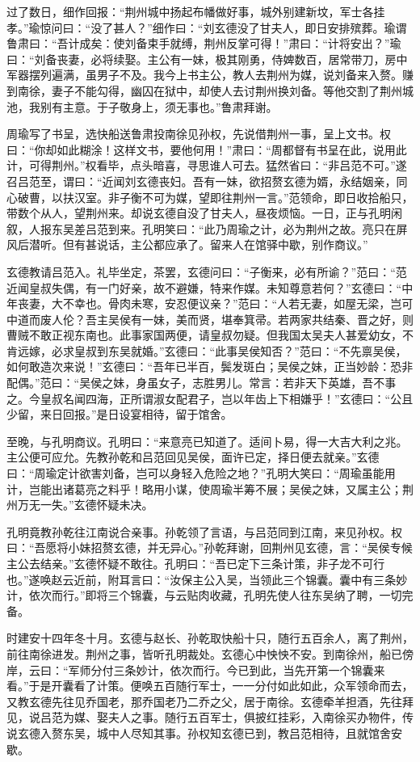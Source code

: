 过了数日，细作回报：“荆州城中扬起布幡做好事，城外别建新坟，军士各挂孝。”瑜惊问曰：“没了甚人？”细作曰：“刘玄德没了甘夫人，即日安排殡葬。瑜谓鲁肃曰：“吾计成矣：使刘备束手就缚，荆州反掌可得！”肃曰：“计将安出？”瑜曰：“刘备丧妻，必将续娶。主公有一妹，极其刚勇，侍婢数百，居常带刀，房中军器摆列遍满，虽男子不及。我今上书主公，教人去荆州为媒，说刘备来入赘。赚到南徐，妻子不能勾得，幽囚在狱中，却使人去讨荆州换刘备。等他交割了荆州城池，我别有主意。于子敬身上，须无事也。”鲁肃拜谢。

周瑜写了书呈，选快船送鲁肃投南徐见孙权，先说借荆州一事，呈上文书。权曰：“你却如此糊涂！这样文书，要他何用！”肃曰：“周都督有书呈在此，说用此计，可得荆州。”权看毕，点头暗喜，寻思谁人可去。猛然省曰：“非吕范不可。”遂召吕范至，谓曰：“近闻刘玄德丧妇。吾有一妹，欲招赘玄德为婿，永结姻亲，同心破曹，以扶汉室。非子衡不可为媒，望即往荆州一言。”范领命，即日收拾船只，带数个从人，望荆州来。却说玄德自没了甘夫人，昼夜烦恼。一日，正与孔明闲叙，人报东吴差吕范到来。孔明笑曰：“此乃周瑜之计，必为荆州之故。亮只在屏风后潜听。但有甚说话，主公都应承了。留来人在馆驿中歇，别作商议。”

玄德教请吕范入。礼毕坐定，茶罢，玄德问曰：“子衡来，必有所谕？”范曰：“范近闻皇叔失偶，有一门好亲，故不避嫌，特来作媒。未知尊意若何？”玄德曰：“中年丧妻，大不幸也。骨肉未寒，安忍便议亲？”范曰：“人若无妻，如屋无梁，岂可中道而废人伦？吾主吴侯有一妹，美而贤，堪奉箕帚。若两家共结秦、晋之好，则曹贼不敢正视东南也。此事家国两便，请皇叔勿疑。但我国太吴夫人甚爱幼女，不肯远嫁，必求皇叔到东吴就婚。”玄德曰：“此事吴侯知否？”范曰：“不先禀吴侯，如何敢造次来说！”玄德曰：“吾年已半百，鬓发斑白；吴侯之妹，正当妙龄：恐非配偶。”范曰：“吴侯之妹，身虽女子，志胜男儿。常言：若非天下英雄，吾不事之。今皇叔名闻四海，正所谓淑女配君子，岂以年齿上下相嫌乎！”玄德曰：“公且少留，来日回报。”是日设宴相待，留于馆舍。

至晚，与孔明商议。孔明曰：“来意亮已知道了。适间卜易，得一大吉大利之兆。主公便可应允。先教孙乾和吕范回见吴侯，面许已定，择日便去就亲。”玄德曰：“周瑜定计欲害刘备，岂可以身轻入危险之地？”孔明大笑曰：“周瑜虽能用计，岂能出诸葛亮之料乎！略用小谋，使周瑜半筹不展；吴侯之妹，又属主公；荆州万无一失。”玄德怀疑未决。

孔明竟教孙乾往江南说合亲事。孙乾领了言语，与吕范同到江南，来见孙权。权曰：“吾愿将小妹招赘玄德，并无异心。”孙乾拜谢，回荆州见玄德，言：“吴侯专候主公去结亲。”玄德怀疑不敢往。孔明曰：“吾已定下三条计策，非子龙不可行也。”遂唤赵云近前，附耳言曰：“汝保主公入吴，当领此三个锦囊。囊中有三条妙计，依次而行。”即将三个锦囊，与云贴肉收藏，孔明先使人往东吴纳了聘，一切完备。

时建安十四年冬十月。玄德与赵长、孙乾取快船十只，随行五百余人，离了荆州，前往南徐进发。荆州之事，皆听孔明裁处。玄德心中怏怏不安。到南徐州，船已傍岸，云曰：“军师分付三条妙计，依次而行。今已到此，当先开第一个锦囊来看。”于是开囊看了计策。便唤五百随行军士，一一分付如此如此，众军领命而去，又教玄德先往见乔国老，那乔国老乃二乔之父，居于南徐。玄德牵羊担酒，先往拜见，说吕范为媒、娶夫人之事。随行五百军士，俱披红挂彩，入南徐买办物件，传说玄德入赘东吴，城中人尽知其事。孙权知玄德已到，教吕范相待，且就馆舍安歇。

